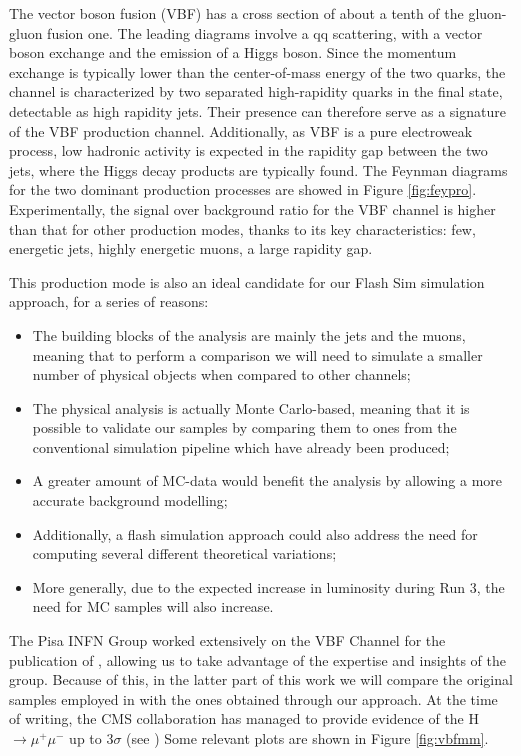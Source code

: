 The vector boson fusion (VBF) has a cross section of about a tenth of the gluon-gluon fusion one. The leading diagrams involve a qq scattering, with a
vector boson exchange and the emission of a Higgs boson. Since the momentum exchange
is typically lower than the center-of-mass energy of the two quarks, the channel is characterized by two separated high-rapidity quarks in the final state, detectable as high rapidity
jets. Their presence can therefore serve as a signature of the VBF production channel. Additionally, as VBF is a pure electroweak process, low hadronic activity is expected in the
rapidity gap between the two jets, where the Higgs decay products are typically found. The Feynman diagrams for the two dominant production processes are showed in Figure \ref{fig:feypro}. Experimentally, the signal over background ratio for the VBF channel is higher than that for other production modes, thanks to its key characteristics: few, energetic jets, highly energetic muons, a large rapidity gap.

This production mode is also an ideal candidate for our Flash Sim simulation approach, for a series of reasons:

\begin{itemize}
    \item The building blocks of the analysis are mainly the jets and the muons, meaning that to perform a comparison we will need to simulate a smaller number of physical objects when compared to other channels;
    \item The physical analysis is actually Monte Carlo-based, meaning that it is possible to validate our samples by comparing them to ones from the conventional simulation pipeline which have already been produced;
    \item A greater amount of MC-data would benefit the analysis by allowing a more accurate background modelling;
    \item Additionally, a flash simulation approach could also address the need for computing several different theoretical variations;
    \item More generally, due to the expected increase in luminosity during Run 3, the need for MC samples will also increase.
\end{itemize}

The Pisa INFN Group worked extensively on the VBF Channel for the publication of \cite{CMS-PAS-HIG-19-006}, allowing us to take advantage of the expertise and insights of the group.
Because of this, in the latter part of this work we will compare the original samples employed in \cite{CMS-PAS-HIG-19-006} with the ones obtained through our approach.
At the time of writing, the CMS collaboration has managed to provide evidence of the H$\rightarrow\mu^+\mu^-$ up to 3$\sigma$ (see \cite{Sirunyan_2021}) Some relevant plots are shown in Figure \ref{fig:vbfmm}.

